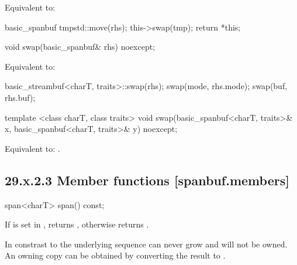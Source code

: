 \documentclass[ebook,11pt,article]{memoir}
\begin{document}
\begin{itemdescr}
\pnum
\effects Equivalent to:
\begin{codeblock}
    basic_spanbuf tmp{std::move(rhs)};
    this->swap(tmp);
    return *this;
\end{codeblock}
\end{itemdescr}

\begin{itemdecl}
void swap(basic_spanbuf& rhs) noexcept;
\end{itemdecl}

\begin{itemdescr}
\pnum
\effects Equivalent to:
\begin{codeblock} 
    basic_streambuf<charT, traits>::swap(rhs);
    swap(mode, rhs.mode);
    swap(buf, rhs.buf);
\end{codeblock}
\end{itemdescr}

\begin{itemdecl}
template <class charT, class traits>
  void swap(basic_spanbuf<charT, traits>& x,
            basic_spanbuf<charT, traits>& y) noexcept;
\end{itemdecl}

\begin{itemdescr}
\pnum
\effects Equivalent to: .
\end{itemdescr}


\subsection{29.x.2.3 Member functions [spanbuf.members]}

\begin{itemdecl}
span<charT> span() const;
\end{itemdecl}

\begin{itemdescr}
\pnum
\returns
If  is set in ,
returns , 
otherwise returns . 

\begin{note}
In constrast to  the underlying sequence can never grow and will not be owned. An owning copy can be obtained by converting the result to .
\end{note}


\end{itemdescr}
\end{document}
